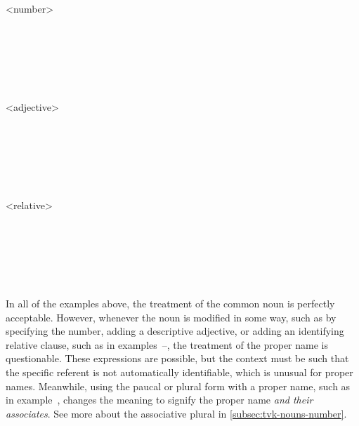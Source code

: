	\begin{minipage}[t]{0.5\remaining}
		\\
		\\
		\end{minipage}
	\a<number>\ljudge{\ques}\remainpex\begin{minipage}[t]{0.5\remaining}
		\\
		\\
	\end{minipage}
	\begin{minipage}[t]{0.5\remaining}
		\\
		\\
	\end{minipage}
	\a<adjective>\ljudge{\ques}\remainpex\begin{minipage}[t]{0.5\remaining}
		\\
		\\
	\end{minipage}
	\begin{minipage}[t]{0.5\remaining}
		\\
		\\
	\end{minipage}
	\a<relative>\ljudge{\ques}\remainpex\begin{minipage}[t]{0.5\remaining}
		\\
		\\
	\end{minipage}
	\begin{minipage}[t]{0.5\remaining}
		\\
		\\
	\end{minipage}
\xe

In all of the examples above, the treatment of the common noun  is perfectly acceptable. However, whenever the noun is modified in some way, such as by specifying the number, adding a descriptive adjective, or adding an identifying relative clause, such as in examples~–, the treatment of the proper name  is questionable. These expressions are possible, but the context must be such that the specific referent is not automatically identifiable, which is unusual for proper names. Meanwhile, using the paucal or plural form with a proper name, such as in example~, changes the meaning to signify the proper name \emph{and their associates}. See more about the associative plural in \autoref{subsec:tvk-nouns-number}.

